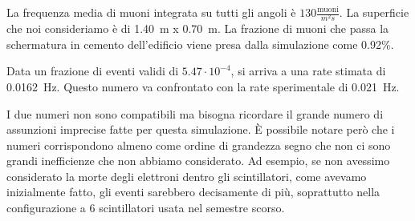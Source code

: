 La frequenza media di muoni integrata su tutti gli angoli \`e $130 \frac{\mathrm{muoni}}{m^2 s}$. La superficie che noi consideriamo \`e di 1.40~m x 0.70~m. 
La frazione di muoni che passa la schermatura in cemento dell'edificio viene presa dalla simulazione come 0.92\%.

Data un frazione di eventi validi di $5.47\cdot 10^{-4}$, si arriva a una rate stimata di 0.0162~Hz. 
Questo numero va confrontato con la rate sperimentale di 0.021~Hz.

I due numeri non sono compatibili ma bisogna ricordare il grande numero di assunzioni imprecise fatte per questa simulazione. 
\`E possibile notare per\`o che i numeri corrispondono almeno come ordine di grandezza segno che non ci sono grandi inefficienze che non abbiamo considerato. 
Ad esempio, se non avessimo considerato la morte degli elettroni dentro gli scintillatori, come avevamo inizialmente fatto, gli eventi sarebbero decisamente di pi\`u, soprattutto nella configurazione a 6 scintillatori usata nel semestre scorso.


